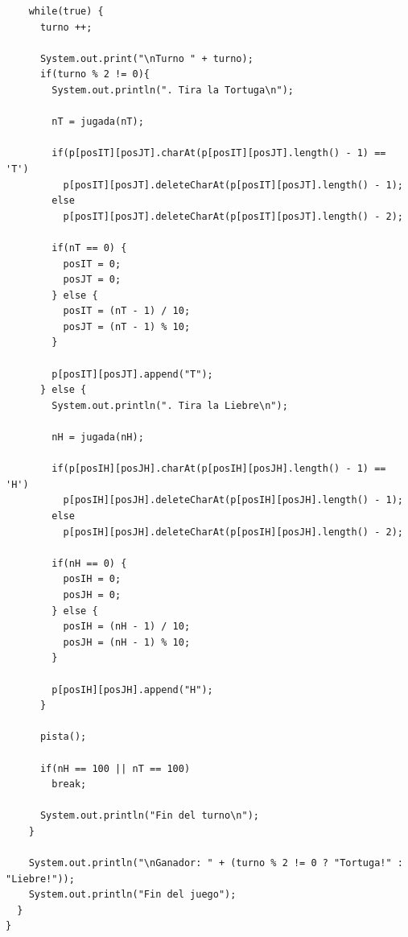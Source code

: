 \documentclass[11pt, twocolumn]{article}
\begin{document}
\begin{lstlisting}
    while(true) {
      turno ++;

      System.out.print("\nTurno " + turno);	
      if(turno % 2 != 0){
        System.out.println(". Tira la Tortuga\n");
        
        nT = jugada(nT);

        if(p[posIT][posJT].charAt(p[posIT][posJT].length() - 1) == 'T')
          p[posIT][posJT].deleteCharAt(p[posIT][posJT].length() - 1);
        else
          p[posIT][posJT].deleteCharAt(p[posIT][posJT].length() - 2);
        
        if(nT == 0) {
          posIT = 0;
          posJT = 0;
        } else {
          posIT = (nT - 1) / 10;
          posJT = (nT - 1) % 10;
        }

        p[posIT][posJT].append("T");
      } else {
        System.out.println(". Tira la Liebre\n");
        
        nH = jugada(nH);

        if(p[posIH][posJH].charAt(p[posIH][posJH].length() - 1) == 'H')
          p[posIH][posJH].deleteCharAt(p[posIH][posJH].length() - 1);
        else
          p[posIH][posJH].deleteCharAt(p[posIH][posJH].length() - 2);

        if(nH == 0) {
          posIH = 0;
          posJH = 0;
        } else {
          posIH = (nH - 1) / 10;
          posJH = (nH - 1) % 10;
        }

        p[posIH][posJH].append("H");
      }
      
      pista();
      
      if(nH == 100 || nT == 100)
        break;

      System.out.println("Fin del turno\n");
    }

    System.out.println("\nGanador: " + (turno % 2 != 0 ? "Tortuga!" : "Liebre!"));
    System.out.println("Fin del juego");
  }
}    
  \end{lstlisting}
\end{document}
